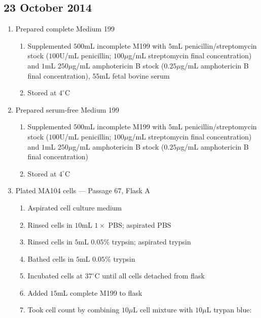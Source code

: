 \subsection*{23 October 2014}

\begin{enumerate}
	\item Prepared complete Medium 199
		\begin{enumerate}
				\item Supplemented $500$mL incomplete M199 with $5$mL penicillin/streptomycin stock ($100$U/mL penicillin; $100\mu$g/mL streptomycin final concentration) and $1$mL $250\mu$g/mL amphotericin B stock ($0.25\mu$g/mL amphotericin B final concentration), $55$mL fetal bovine serum
				\item Stored at $4^{\circ}$C
		\end{enumerate}
	\item Prepared serum-free Medium 199
		\begin{enumerate}
			\item Supplemented $500$mL incomplete M199 with $5$mL penicillin/streptomycin stock ($100$U/mL penicillin; $100\mu$g/mL streptomycin final concentration) and $1$mL $250\mu$g/mL amphotericin B stock ($0.25\mu$g/mL amphotericin B final concentration)
			\item Stored at $4^{\circ}$C
		\end{enumerate}
		
	\item Plated MA104 cells --- Passage 67, Flask A
		\begin{enumerate}
			\item Aspirated cell culture medium
			\item Rinsed cells in $10$mL $1\times$ PBS; aspirated PBS
			\item Rinsed cells in $5$mL $0.05$\% trypsin; aspirated trypsin
			\item Bathed cells in $5$mL $0.05$\% trypsin
			\item Incubated cells at $37^{\circ}$C until all cells detached from flask
			\item Added $15$mL complete M199 to flask
			\item Took cell count by combining $10\mu$L cell mixture with $10\mu$L trypan blue:
			

\end{enumerate}
\end{enumerate}
